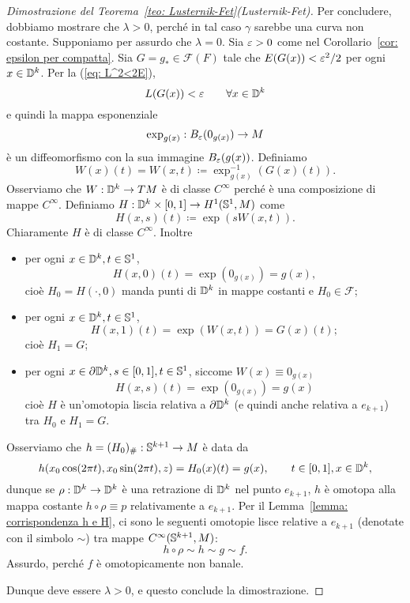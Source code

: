 \begin{proof}[Dimostrazione del Teorema~\ref{teo: Lusternik-Fet}(Lusternik-Fet)]
	Per concludere, dobbiamo mostrare che \(\lambda >0\), perché in tal caso \(\gamma\) sarebbe una curva non costante. Supponiamo per assurdo che \(\lambda=0\). Sia \(\varepsilon>0\) come nel Corollario~\ref{cor: epsilon per compatta}. Sia \(G=g_* \in \mathcal{F}(F)\) tale che \(E(G(x))<\varepsilon^2/2\) per ogni \(x \in \mathbb{D}^k\). Per la (\ref{eq: L^2<2E}), 
	\[
		L(G(x)) < \varepsilon \qquad \forall x \in \mathbb{D}^k
	\]
	e quindi la mappa esponenziale 
	\[
		\exp_{g(x)}: B_\varepsilon(0_{g(x)}) \to M
	\] 
	è un diffeomorfismo con la sua immagine \(B_\varepsilon(g(x))\). Definiamo
	\[
		W(x)(t) = W(x,t) \coloneq \exp_{g(x)}^{-1}(G(x)(t)).
	\]
	Osserviamo che \(W: \mathbb{D}^k \to TM\) è di classe \(C^\infty\) perché è una composizione di mappe \(C^\infty\). Definiamo \(H: \mathbb{D}^k \times [0,1] \to H^1(\mathbb{S}^1,M) \) come
	\[
		H(x,s)(t) \coloneq \exp(sW(x,t)).
	\]
	Chiaramente \(H\) è di classe \(C^\infty\). Inoltre
	\begin{itemize}
		\item per ogni \(x \in \mathbb{D}^k, t \in \mathbb{S}^1\),
		\[
			H(x,0)(t) =\exp(0_{g(x)}) = g(x),
		\]
		cioè \(H_0=H(\cdot,0)\) manda punti di \(\mathbb{D}^k\) in mappe costanti e \(H_0 \in \mathcal{F}\);
		\item per ogni \(x \in \mathbb{D}^k, t \in \mathbb{S}^1\),
		\[
			H(x,1)(t) = \exp(W(x,t)) = G(x)(t);
		\]
		cioè \(H_1=G\);
		\item per ogni \(x \in \partial \mathbb{D}^k, s \in [0,1], t \in \mathbb{S}^1\), siccome \(W(x) \equiv 0_{g(x)}\)
		\[
			H(x,s)(t) = \exp(0_{g(x)}) = g(x) 
		\]
		cioè \(H\) è un'omotopia liscia relativa a \(\partial \mathbb{D}^k\) (e quindi anche relativa a \(e_{k+1}\)) tra \(H_0\) e \(H_1=G\).
	\end{itemize}
	
	
	
	Osserviamo che \(h=(H_0)_\#: \mathbb{S}^{k+1} \to M\) è data da
	\[
	h(x_0 \cos (2\pi t), x_0 \sin (2 \pi t), z) = H_0(x)(t)=g(x), \qquad t \in [0,1], x \in \mathbb{D}^k,
	\]
	dunque se \(\rho:\mathbb{D}^k \to \mathbb{D}^k\) è una retrazione di \(\mathbb{D}^k\) nel punto \(e_{k+1}\), \(h\) è omotopa alla mappa costante \(h \circ \rho \equiv p\) relativamente a \(e_{k+1}\). Per il Lemma~\ref{lemma: corrispondenza h e H}, ci sono le seguenti omotopie lisce relative a \(e_{k+1}\)  (denotate con il simbolo \(\sim\)) tra mappe \(C^\infty(\mathbb{S}^{k+1},M)\):
	\[
		h \circ \rho \sim h \sim g \sim f.
	\]
	Assurdo, perché \(f\) è omotopicamente non banale. 
	
	Dunque deve essere \(\lambda>0\), e questo conclude la dimostrazione.
\end{proof}


